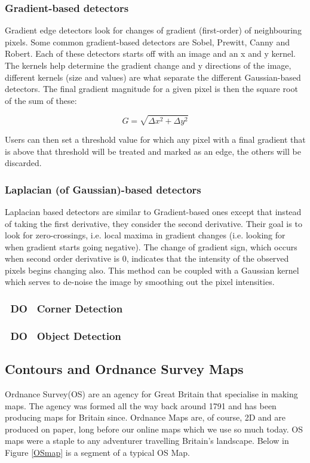 \documentclass[11pt]{article}
\begin{document}
\subsubsection{Gradient-based detectors}
Gradient edge detectors look for changes of gradient (first-order) of 
neighbouring pixels. Some common gradient-based detectors are Sobel,
Prewitt, Canny and Robert. Each of these detectors starts off with an image
and an x and y kernel. The kernels help determine the gradient change
and y directions of the image, different kernels (size and values) are what
separate the different Gaussian-based detectors. The final gradient magnitude
for a given pixel is then the square root of the sum of these: 

\begin{equation}
	G = \sqrt{\Delta x^2 + \Delta y^2} 
\end{equation}

Users can then set a threshold value for which any pixel with a final
gradient that is above that threshold will be treated and marked as an edge,
the others will be discarded.

\subsubsection{Laplacian (of Gaussian)-based detectors}
Laplacian based detectors are similar to Gradient-based ones except that 
instead of taking the first derivative, they consider the second derivative.
Their goal is to look for zero-crossings, i.e. local maxima in 
gradient changes (i.e. looking for when gradient starts going negative). The
change of gradient sign, which occurs when second order derivative is 0,
indicates that the intensity of the observed pixels begins changing also. This
method can be coupled with a Gaussian kernel which serves to de-noise the
image by smoothing out the pixel intensities. 

\subsubsection{~DO~ Corner Detection}

\subsubsection{~DO~ Object Detection}

\subsection{Contours and Ordnance Survey Maps}
Ordnance Survey(OS) are an agency for Great Britain that specialise in
making maps. The agency was formed all the way back around 1791 and has
been producing maps for Britain since. Ordnance Maps are, of course, 2D and
are produced on paper, long before our online maps which we use so much 
today. OS maps were a staple to any adventurer travelling Britain's
landscape. Below in Figure \ref{OSmap} is a segment of a typical OS Map.
\end{document}
